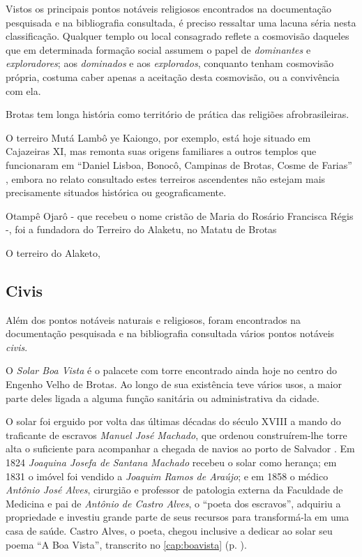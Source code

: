 Vistos os principais pontos notáveis religiosos encontrados na documentação pesquisada e na bibliografia consultada, é preciso ressaltar uma lacuna séria nesta classificação. Qualquer templo ou local consagrado reflete a cosmovisão daqueles que em determinada formação social assumem o papel de \textit{dominantes} e \textit{exploradores}; aos \textit{dominados} e aos \textit{explorados}, conquanto tenham cosmovisão própria, costuma caber apenas a aceitação desta cosmovisão, ou a convivência com ela. 

Brotas tem longa história como território de prática das religiões afrobrasileiras. 

O terreiro Mutá Lambô ye Kaiongo, por exemplo, está hoje situado em Cajazeiras XI, mas remonta suas origens familiares a outros templos que funcionaram em ``Daniel Lisboa, Bonocô, Campinas de Brotas, Cosme de Farias'' \cite[p.~50]{alves_paquetan_2010}, embora no relato consultado estes terreiros ascendentes não estejam mais precisamente situados histórica ou geograficamente.

Otampê Ojarô - que recebeu o nome cristão de Maria do Rosário Francisca Régis -, foi a fundadora do Terreiro do Alaketu, no Matatu de Brotas



O terreiro do Alaketo,



\subsection{Civis}\label{subsec:pontciv}

Além dos pontos notáveis naturais e religiosos, foram encontrados na documentação pesquisada e na bibliografia consultada vários pontos notáveis \textit{civis}.

O \textit{Solar Boa Vista} é o palacete com torre encontrado ainda hoje no centro do Engenho Velho de Brotas. Ao longo de sua existência teve vários usos, a maior parte deles ligada a alguma função sanitária ou administrativa da cidade.

O solar foi erguido por volta das últimas décadas do século XVIII a mando do traficante de escravos \textit{Manuel José Machado}, que ordenou construírem-lhe torre alta o suficiente para acompanhar a chegada de navios ao porto de Salvador \cite[p.~127]{mattos_panorama_2011}. Em 1824 \textit{Joaquina Josefa de Santana Machado} recebeu o solar como herança; em 1831 o imóvel foi vendido a \textit{Joaquim Ramos de Araújo}; e em 1858 o médico \textit{Antônio José Alves}, cirurgião e professor de patologia externa da Faculdade de Medicina e pai de \textit{Antônio de Castro Alves}, o ``poeta dos escravos'', adquiriu a propriedade e investiu grande parte de seus recursos para transformá-la em uma casa de saúde. Castro Alves, o poeta, chegou inclusive a dedicar ao solar seu poema ``A Boa Vista'', transcrito no \autoref{cap:boavista} (p. \pageref{cap:boavista}).

